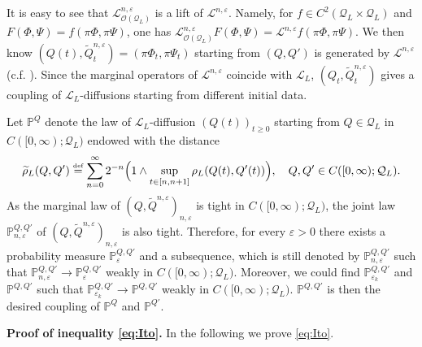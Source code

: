 \documentclass[11pt,UTF-8,reqno]{amsart}
\numberwithin{equation}{section}
\def\eps{\varepsilon}
\newcommand{\eqdef}{\stackrel{\mbox{\tiny def}}{=}}
\def\cL{{\mathcal L}}
\def\cQ{{\mathcal Q}}
\def\mP{{\mathbb P}}
\def\sO{{\mathscr O}}
\def\geq{\geqslant}
\def\eps{\varepsilon}
\def\geq{\geqslant}
\begin{document}
It is easy to see that $\cL^{n,\eps}_{\sO(\cQ_L)}$ is a lift of $\cL^{n,\eps}$.
Namely, for $f\in C^2(\cQ_L\times \cQ_L)$ and $F(\Phi,\Psi)=f(\pi\Phi,\pi\Psi)$,
 one has
$\cL^{n,\eps}_{\sO(\cQ_L)}F(\Phi,\Psi)=\cL^{n,\eps}f(\pi\Phi,\pi\Psi)$.
We then know $(Q(t),\widetilde{Q}^{n,\eps}_t)=(\pi\Phi_t,\pi\Psi_t)$ starting from $(Q,Q')$ is generated by $\cL^{n,\eps}$
(c.f. \cite[Section~2.1]{Wang}).
Since the marginal operators of $\cL^{n,\eps}$ coincide with $\cL_L$, $(Q_t,\widetilde{Q}^{n,\eps}_t)$ gives a coupling of $\cL_L$-diffusions starting from different initial data.

Let $\mP^Q$ denote the law of $\cL_L$-diffusion $(Q(t))_{t\geq0}$ starting from $Q\in \cQ_L$ in $C([0,\infty);\cQ_L)$ endowed with the distance
\begin{align*}
	\widetilde{\rho}_L(Q,Q')\eqdef\sum_{n=0}^\infty 2^{-n}\Big(1\wedge \sup_{t\in [n,n+1]}\rho_L(Q(t),Q'(t))\Big), \quad Q, Q'\in C([0,\infty);\cQ_L).
\end{align*}
As  the marginal law of  $(Q,\widetilde{Q}^{n,\eps})_{n,\eps}$
is tight in $C([0,\infty);\cQ_L)$, the joint law $\mP^{Q,Q'}_{n,\eps}$ of $(Q,\widetilde{Q}^{n,\eps})_{n,\eps}$  is also tight.
Therefore, for every $\eps>0$ there exists a probability measure
$\mP_\eps^{Q,Q'}$ and a subsequence, which is still denoted by $\mP_{n,\eps}^{Q,Q'}$ such that
$\mP_{n,\eps}^{Q,Q'}\to \mP_\eps^{Q,Q'}$ weakly in $C([0,\infty);\cQ_L)$. Moreover, we could find  $\mP_{\eps_k}^{Q,Q'}$ and $\mP^{Q,Q'}$ such that $\mP_{\eps_k}^{Q,Q'}\to\mP^{Q,Q'}$ weakly in $C([0,\infty);\cQ_L)$.
$\mP^{Q,Q'}$ is then the desired coupling of $\mP^Q$ and $\mP^{Q'}$.


{\bf Proof of inequality \eqref{eq:Ito}.}
In the following we prove \eqref{eq:Ito}.
\end{document}
